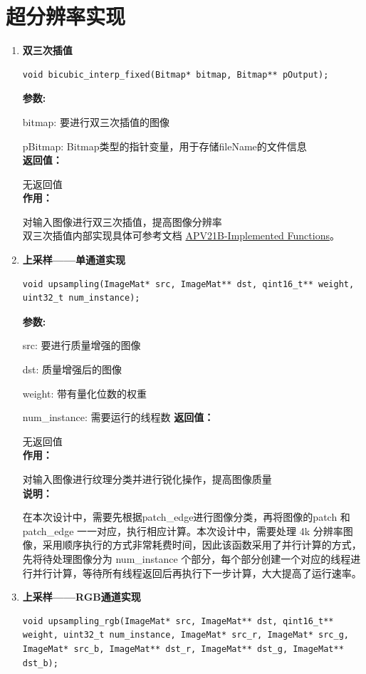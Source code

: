 \documentclass[12pt, a4paper, oneside]{ctexbook}
\begin{document}
	\section{超分辨率实现}
	\begin{enumerate}
		\item \textbf{双三次插值}
		\begin{lstlisting}[numbers=none]
void bicubic_interp_fixed(Bitmap* bitmap, Bitmap** pOutput);
		\end{lstlisting}
		\textbf{参数:} \par bitmap: 要进行双三次插值的图像 \par pBitmap: Bitmap类型的指针变量，用于存储fileName的文件信息 \\
		\textbf{返回值：}\par 无返回值\\
		\textbf{作用：}\par 对输入图像进行双三次插值，提高图像分辨率\\
		双三次插值内部实现具体可参考文档 \href{./ref/APV21B_Implemented_Functions.pdf}{APV21B-Implemented Functions}。
	
	\item \textbf{上采样——单通道实现}
		\begin{lstlisting}[numbers=none]
void upsampling(ImageMat* src, ImageMat** dst, qint16_t** weight, uint32_t num_instance);			
		\end{lstlisting}
		\textbf{参数:} \par src: 要进行质量增强的图像 \par dst: 质量增强后的图像\par weight: 带有量化位数的权重\par num\_instance: 需要运行的线程数
		\textbf{返回值：}\par 无返回值\\
		\textbf{作用：}\par 对输入图像进行纹理分类并进行锐化操作，提高图像质量\\
		\textbf{说明：}\par 在本次设计中，需要先根据patch\_edge进行图像分类，再将图像的patch 和 patch\_edge 一一对应，执行相应计算。本次设计中，需要处理 4k 分辨率图像，采用顺序执行的方式非常耗费时间，因此该函数采用了并行计算的方式，先将待处理图像分为 num\_instance 个部分，每个部分创建一个对应的线程进行并行计算，等待所有线程返回后再执行下一步计算，大大提高了运行速率。
		
		\item \textbf{上采样——RGB通道实现}
			\begin{lstlisting}[numbers=none]
void upsampling_rgb(ImageMat* src, ImageMat** dst, qint16_t** weight, uint32_t num_instance, ImageMat* src_r, ImageMat* src_g, ImageMat* src_b, ImageMat** dst_r, ImageMat** dst_g, ImageMat** dst_b);
			\end{lstlisting}
	

\end{enumerate}
\end{document}
